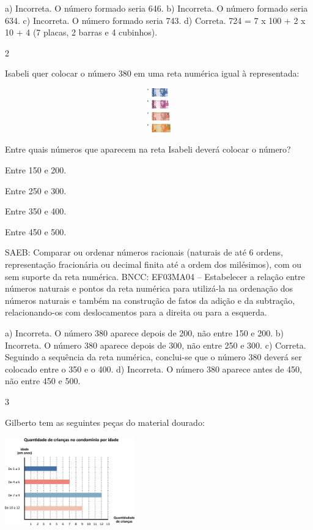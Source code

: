 {\begin{escolha}
{a) Incorreta. O número formado seria 646.
b) Incorreta. O número formado seria 634.
c) Incorreta. O número formado seria 743.
d) Correta. 724 = 7 x 100 + 2 x 10 + 4 (7 placas, 2 barras e 4 cubinhos).

\num{2}

Isabeli quer colocar o número 380 em uma reta numérica igual à representada:


\includegraphics[width=5.90556in,height=0.74931in]{media/image117.png}

Entre quais números que aparecem na reta Isabeli deverá colocar o número?

\begin{escolha}
\item
  Entre 150 e 200.
\item
  Entre 250 e 300.
\item
  Entre 350 e 400.
\item
  Entre 450 e 500.
\end{escolha}

SAEB: Comparar ou ordenar números racionais (naturais de até 6 ordens, representação fracionária ou decimal finita até a ordem dos milésimos), com ou sem suporte da reta numérica.
BNCC: EF03MA04 -- Estabelecer a relação entre números naturais e pontos da reta numérica para
utilizá-la na ordenação dos números naturais e também na construção de fatos da adição e da
subtração, relacionando-os com deslocamentos para a direita ou para a esquerda.

a) Incorreta. O número 380 aparece depois de 200, não entre 150 e 200.
b) Incorreta. O número 380 aparece depois de 300, não entre 250 e 300.
c) Correta. Seguindo a sequência da reta numérica, conclui-se que o número 380 deverá ser colocado entre o 350 e o 400.
d) Incorreta. O número 380 aparece antes de 450, não entre 450 e 500.

\num{3}

Gilberto tem as seguintes peças do material dourado:


\includegraphics[width=2.20852in,height=1.52513in]{media/image118.png}

}
\end{escolha}}
